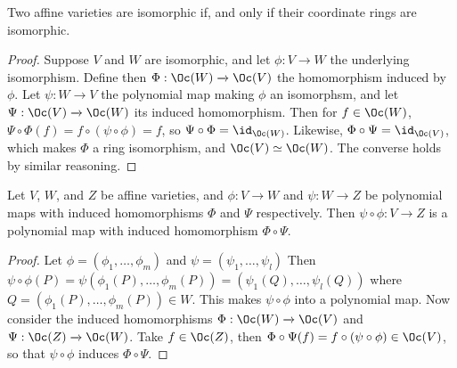 \begin{proposition}\label{proposition_2.1.5}
  Two affine varieties are isomorphic if, and only if their coordinate rings are
  isomorphic.
\end{proposition}
\begin{proof}
  Suppose $V$ and $W$ are isomorphic, and let $\phi:V \xrightarrow{} W$ the
  underlying isomorphism. Define then $\Phi:\Oc(W) \xrightarrow{} \Oc(V)$ the
  homomorphism induced by $\phi$. Let $\psi:W \xrightarrow{} V$ the polynomial
  map making $\phi$ an isomorphsm, and let $\Psi:\Oc(V) \xrightarrow{} \Oc(W)$
  its induced homomorphism. Then for $f \in \Oc(W)$, $\Psi \circ \Phi(f)=f \circ
  (\psi \circ \phi)=f$, so $\Psi \circ \Phi=\id_{\Oc(W)}$. Likewise, $\Phi \circ
  \Psi=\id_{\Oc(V)}$, which makes $\Phi$ a ring isomorphism, and $\Oc(V) \simeq
  \Oc(W)$. The converse holds by similar reasoning.
\end{proof}

\begin{proposition}\label{proposition_2.1.8}
  Let $V$, $W$, and $Z$ be affine varieties, and  $\phi:V \xrightarrow{} W$
  and $\psi:W \xrightarrow{} Z$ be polynomial maps with induced homomorphisms
  $\Phi$ and  $\Psi$ respectively. Then  $\psi \circ \phi:V \xrightarrow{} Z$ is
  a polynomial map with induced homomorphism $\Phi \circ \Psi$.
\end{proposition}
\begin{proof}
  Let $\phi=(\phi_1, \dots, \phi_m)$ and $\psi=(\psi_1, \dots, \psi_l)$ Then
  $\psi \circ \phi(P)=\psi(\phi_1(P), \dots, \phi_m(P))=(\psi_1(Q), \dots,
  \psi_l(Q))$ where $Q=(\phi_1(P), \dots, \phi_m(P)) \in W$. This makes $\psi
  \circ \phi$ into a polynomial map. Now consider the induced homomorphisms
  $\Phi:\Oc(W) \xrightarrow{} \Oc(V)$ and $\Psi:\Oc(Z) \xrightarrow{} \Oc(W)$.
  Take $f \in \Oc(Z)$, then $\Phi \circ \Psi(f)=f \circ (\psi \circ \phi) \in
  \Oc(V)$, so that $\psi \circ \phi$ induces  $\Phi \circ \Psi$.
\end{proof}

